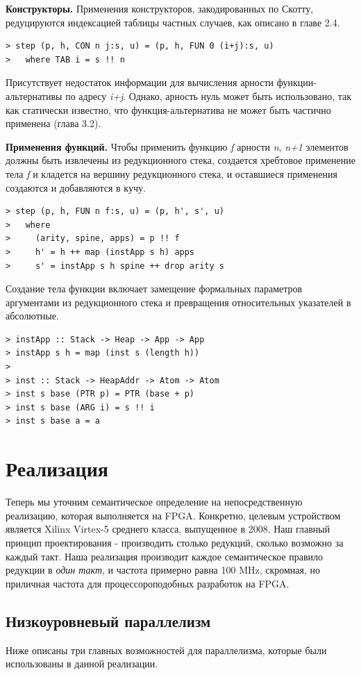 \documentclass[flenqn, 14pt]{extarticle}
\begin{document}
\textbf{Конструкторы.} Применения конструкторов, закодированных по Скотту, редуцируются индексацией таблицы частных случаев, как описано в главе 2.4.
\begin{verbatim}
> step (p, h, CON n j:s, u) = (p, h, FUN 0 (i+j):s, u)
>   where TAB i = s !! n
\end{verbatim}

Присутствует недостаток информации для вычисления арности функции-альтернативы по адресу \textit{i+j}. Однако, арность нуль может быть использовано, так как статически известно, что функция-альтернатива не может быть частично применена (глава 3.2).

\textbf{Применения функций.} Чтобы применить функцию \textit{f} арности \textit{n}, \textit{n+1} элементов должны быть извлечены из редукционного стека, создается хребтовое применение тела \textit{f} и кладется на вершину редукционного стека, и оставшиеся применения создаются и добавляются в кучу.

\begin{verbatim}
> step (p, h, FUN n f:s, u) = (p, h', s', u)
>   where
>     (arity, spine, apps) = p !! f
>     h' = h ++ map (instApp s h) apps
>     s' = instApp s h spine ++ drop arity s
\end{verbatim}

Создание тела функции включает замещение формальных параметров аргументами из редукционного стека и превращения относительных указателей в абсолютные.
\begin{verbatim}
> instApp :: Stack -> Heap -> App -> App
> instApp s h = map (inst s (length h))
>
> inst :: Stack -> HeapAddr -> Atom -> Atom
> inst s base (PTR p) = PTR (base + p)
> inst s base (ARG i) = s !! i
> inst s base a = a
\end{verbatim}

\section{Реализация}
Теперь мы уточним семантическое определение на непосредственную реализацию, которая выполняется на FPGA. Конкретно, целевым устройством является Xilinx Virtex-5 среднего класса, выпущенное в 2008. Наш главный принцип проектирования - производить столько редукций, сколько возможно за каждый такт. Наша реализация производит каждое семантическое правило редукции в \textit{один такт}, и частота примерно равна 100 MHz, скромная, но приличная частота для процессороподобных разработок на FPGA.

\subsection{Низкоуровневый параллелизм}
Ниже описаны три главных возможностей для параллелизма, которые были использованы в данной реализации.
\end{document}
